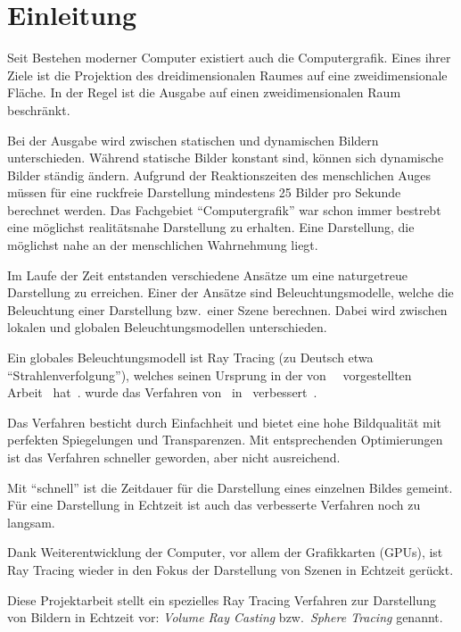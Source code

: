 
\chapter{Einleitung}
\label{chap:10_introduction}

Seit Bestehen moderner Computer existiert auch die Computergrafik.
Eines ihrer Ziele ist die Projektion des dreidimensionalen Raumes auf
eine zweidimensionale Fläche. In der Regel ist die Ausgabe auf einen
zweidimensionalen Raum beschränkt.

Bei der Ausgabe wird zwischen statischen und dynamischen Bildern
unterschieden. Während statische Bilder konstant sind, können sich
dynamische Bilder ständig ändern. Aufgrund der Reaktionszeiten des
menschlichen Auges müssen für eine ruckfreie Darstellung mindestens 25
Bilder pro Sekunde berechnet werden.
Das Fachgebiet ``Computergrafik'' war schon immer bestrebt eine
möglichst realitätsnahe Darstellung zu erhalten. Eine Darstellung, die
möglichst nahe an der menschlichen Wahrnehmung liegt.

Im Laufe der Zeit entstanden verschiedene Ansätze um eine naturgetreue
Darstellung zu erreichen. Einer der Ansätze sind Beleuchtungsmodelle,
welche die Beleuchtung einer Darstellung bzw.\ einer Szene berechnen.
Dabei wird zwischen lokalen und globalen Beleuchtungsmodellen
unterschieden.

Ein globales Beleuchtungsmodell ist Ray Tracing (zu Deutsch etwa
``Strahlenverfolgung''), welches seinen Ursprung in der
von~\citeauthor{appel_techniques_1968}~\citeyear{appel_techniques_1968}
vorgestellten Arbeit~
hat~\parencite{appel_techniques_1968}.  \citeyear{whitted_improved_1980}
wurde das Verfahren von~\citeauthor{whitted_improved_1980}
in~
verbessert~\parencite{whitted_improved_1980}.

Das Verfahren besticht durch Einfachheit und bietet eine hohe
Bildqualität mit perfekten Spiegelungen und Transparenzen. Mit
entsprechenden Optimierungen ist das Verfahren schneller geworden, aber
nicht ausreichend.

Mit ``schnell'' ist die Zeitdauer für die Darstellung eines einzelnen
Bildes gemeint. Für eine Darstellung in Echtzeit ist auch das
verbesserte Verfahren noch zu langsam.

Dank Weiterentwicklung der Computer, vor allem der Grafikkarten (GPUs),
ist Ray Tracing wieder in den Fokus der Darstellung von Szenen in
Echtzeit gerückt.

Diese Projektarbeit stellt ein spezielles Ray Tracing Verfahren zur
Darstellung von Bildern in Echtzeit vor: \textit{Volume Ray Casting}
bzw.~\textit{Sphere Tracing} genannt.
